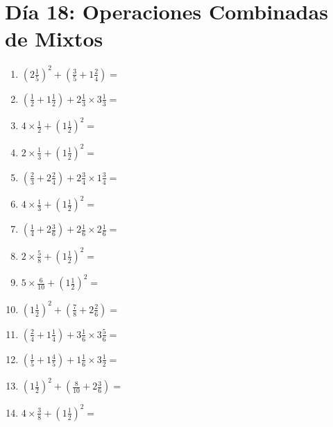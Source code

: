 \documentclass[12pt]{article}
\begin{document}
\section*{Día 18: Operaciones Combinadas de Mixtos}
\begin{enumerate}
\item \large $ (2 \frac{1}{5})^2 + (\frac{3}{5} + 1 \frac{2}{4}) = $ \vspace{1.8cm}
\item \large $ (\frac{1}{2} + 1 \frac{1}{2}) + 2 \frac{1}{3} \times 3 \frac{1}{3} = $ \vspace{1.8cm}
\item \large $ 4 \times \frac{1}{2} + (1 \frac{1}{2})^2 = $ \vspace{1.8cm}
\item \large $ 2 \times \frac{1}{3} + (1 \frac{1}{2})^2 = $ \vspace{1.8cm}
\item \large $ (\frac{2}{3} + 2 \frac{2}{4}) + 2 \frac{3}{4} \times 1 \frac{3}{4} = $ \vspace{1.8cm}
\item \large $ 4 \times \frac{1}{3} + (1 \frac{1}{2})^2 = $ \vspace{1.8cm}
\item \large $ (\frac{1}{4} + 2 \frac{3}{6}) + 2 \frac{1}{6} \times 2 \frac{1}{6} = $ \vspace{1.8cm}
\item \large $ 2 \times \frac{5}{8} + (1 \frac{1}{2})^2 = $ \vspace{1.8cm}
\item \large $ 5 \times \frac{6}{10} + (1 \frac{1}{2})^2 = $ \vspace{1.8cm}
\item \large $ (1 \frac{1}{2})^2 + (\frac{7}{8} + 2 \frac{2}{6}) = $ \vspace{1.8cm}
\newpage
\item \large $ (\frac{2}{4} + 1 \frac{1}{4}) + 3 \frac{1}{6} \times 3 \frac{5}{6} = $ \vspace{1.8cm}
\item \large $ (\frac{1}{5} + 1 \frac{4}{5}) + 1 \frac{1}{6} \times 3 \frac{1}{2} = $ \vspace{1.8cm}
\item \large $ (1 \frac{1}{2})^2 + (\frac{8}{10} + 2 \frac{3}{6}) = $ \vspace{1.8cm}
\item \large $ 4 \times \frac{3}{8} + (1 \frac{1}{2})^2 = $ \vspace{1.8cm}

\end{enumerate}
\end{document}
